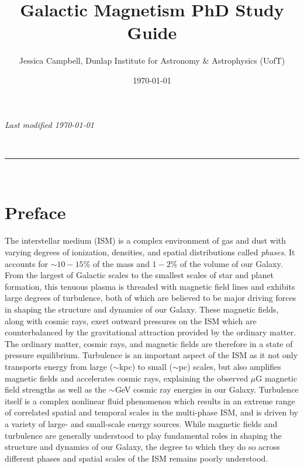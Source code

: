 \documentclass[a4paper,10pt]{article}
\makeatletter
\newcommand{\linia}{\rule{\linewidth}{0.5pt}}
\renewcommand{\maketitle}{
\begin{center}
\vspace{2ex}
{\huge \textsc{\@title}}
\vspace{1ex}
\\
\linia\\
\@author
\vspace{4ex}
\end{center}
}
\makeatother
\begin{document}
\hfill{\textit{Last modified \today}}
\title{Galactic Magnetism PhD Study Guide}
\author{Jessica Campbell, Dunlap Institute for Astronomy \& Astrophysics (UofT)}
\date{\today}
\maketitle
\tableofcontents


\section{Preface}

The interstellar medium (ISM) is a complex environment of gas and dust with varying degrees of ionization, densities, and spatial distributions called \textit{phases}. It accounts for $\sim10-15\%$ of the mass and $1-2\%$ of the volume of our Galaxy. From the largest of Galactic scales to the smallest scales of star and planet formation, this tenuous plasma is threaded with magnetic field lines and exhibits large degrees of turbulence, both of which are believed to be major driving forces in shaping the structure and dynamics of our Galaxy. These magnetic fields, along with cosmic rays, exert outward pressures on the ISM which are counterbalanced by the gravitational attraction provided by the ordinary matter. The ordinary matter, cosmic rays, and magnetic fields are therefore in a state of pressure equilibrium. Turbulence is an important aspect of the ISM as it not only transports energy from large ($\sim$kpc) to small ($\sim$pc) scales, but also amplifies magnetic fields and accelerates cosmic rays, explaining the observed $\mu$G magnetic field strengths as well as the $\sim$GeV cosmic ray energies in our Galaxy. Turbulence itself is a complex nonlinear fluid phenomenon which results in an extreme range of correlated spatial and temporal scales in the multi-phase ISM, and is driven by a variety of large- and small-scale energy sources. While magnetic fields and turbulence are generally understood to play fundamental roles in shaping the structure and dynamics of our Galaxy, the degree to which they do so across different phases and spatial scales of the ISM remains poorly understood.
\end{document}
